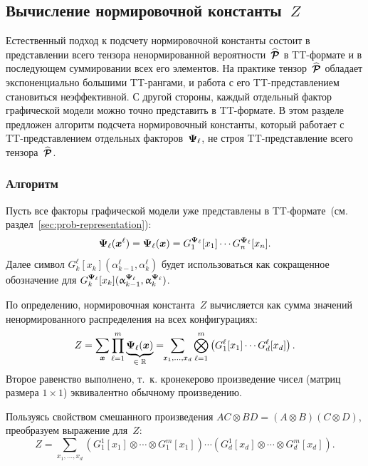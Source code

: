 \subsection{Вычисление нормировочной константы~$Z$}
\label{sec:partition-function}
Естественный подход к подсчету нормировочной константы состоит в представлении всего тензора ненормированной вероятности~$\widehat{\boldsymbol{\mathcal{P}}}$ в TT\hyp{}формате и в последующем суммировании всех его элементов. На практике тензор~$\widehat{\boldsymbol{\mathcal{P}}}$ обладает экспоненциально большими TT\hyp{}рангами, и работа с его TT\hyp{}представлением становиться неэффективной. С другой стороны, каждый отдельный фактор графической модели можно точно представить в TT\hyp{}формате. В этом разделе предложен алгоритм подсчета нормировочный константы, который работает с TT\hyp{}представлением отдельных факторов~$\boldsymbol{\Psi}_{\ell}$, не строя TT\hyp{}представление всего тензора~$\widehat{\boldsymbol{\mathcal{P}}}$.

\subsubsection{Алгоритм}
Пусть все факторы графической модели уже представлены в TT\hyp{}формате~(см. раздел~\ref{sec:prob-representation}):
\begin{equation}
\boldsymbol{\Psi}_{\ell}(\boldsymbol{x}^{\ell}) = \boldsymbol{\Psi}_{\ell}(\boldsymbol{x}) = G^{\boldsymbol{\Psi}_{\ell}}_1[x_1] \dotsm G^{\boldsymbol{\Psi}_{\ell}}_n[x_n].
\end{equation}
Далее символ $G^{\ell}_k[x_k](\alpha^{\ell}_{k - 1}, \alpha^{\ell}_k)$ будет использоваться как сокращенное обозначение для $G^{\boldsymbol{\Psi}_{\ell}}_k[x_k](\upalpha^{\boldsymbol{\Psi}_{\ell}}_{k - 1}, \upalpha^{\boldsymbol{\Psi}_{\ell}}_k)$.

По определению, нормировочная константа~$Z$ вычисляется как сумма значений ненормированного распределения на всех конфигурациях:
\begin{equation*}
Z = \sum_{\boldsymbol{x}} \prod_{\ell = 1}^{m} \underbrace{\boldsymbol{\Psi}_{\ell}(\boldsymbol{x})}_{\text{$\in \mathbb{R}$}}
= \!\!\sum_{x_1, \dots, x_d} \bigotimes_{\ell = 1}^{m} \left (G^{\ell}_1[x_1] \dotsm G^{\ell}_d[x_d]  \right).
\end{equation*}
Второе равенство выполнено, т.~к. кронекерово произведение чисел (матриц размера $1 \times 1$) эквивалентно обычному произведению.


Пользуясь свойством смешанного произведения $AC \otimes BD = (A\otimes B)(C \otimes D)$, преобразуем выражение для~$Z$:
\begin{equation*}
Z =
\sum_{x_1, \dots, x_d} \left ( G^1_1[x_1] \otimes \dotsb \otimes G^m_1[x_1] \right ) \dotsm
\left ( G^1_d[x_d] \otimes \dotsb \otimes G^m_d[x_d] \right ).
\end{equation*}

